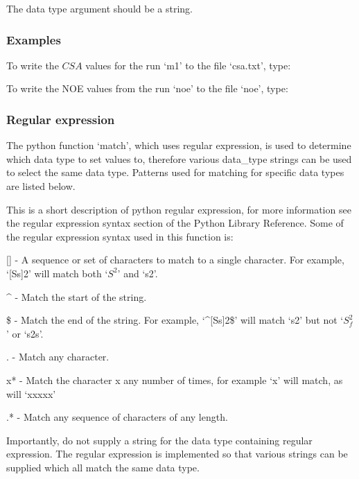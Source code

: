 The data type argument should be a string.


\subsubsection{Examples}

To write the $CSA$ values for the run `m1' to the file `csa.txt', type:



To write the NOE values from the run `noe' to the file `noe', type:





\subsubsection{Regular expression}

The python function `match', which uses regular expression, is used to determine which data
type to set values to, therefore various data\_type strings can be used to select the same
data type.  Patterns used for matching for specific data types are listed below.

This is a short description of python regular expression, for more information see the
regular expression syntax section of the Python Library Reference.  Some of the regular
expression syntax used in this function is:

    [] - A sequence or set of characters to match to a single character.  For example,
    `[Ss]2' will match both `$S^2$' and `s2'.

    \^{} - Match the start of the string.

    \$ - Match the end of the string.  For example, `\^{}[Ss]2\$' will match `s2' but not `$S^2_f$'
    or `s2s'.

    . - Match any character.

    x* - Match the character x any number of times, for example `x' will match, as will
    `xxxxx'

    .* - Match any sequence of characters of any length.

Importantly, do not supply a string for the data type containing regular expression.  The
regular expression is implemented so that various strings can be supplied which all match
the same data type.


